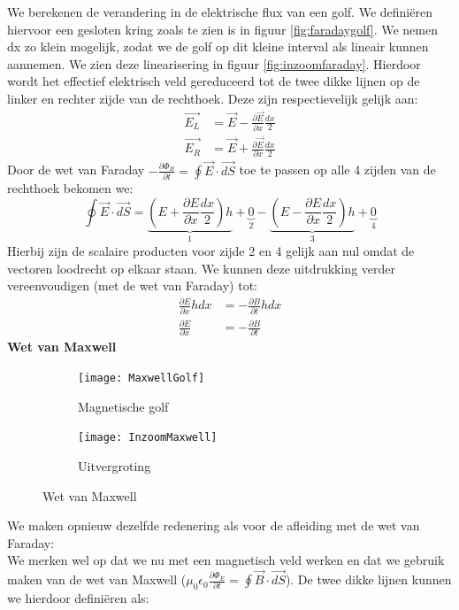 \documentclass[a4paper,kul]{kulakarticle} %
\begin{document}
We berekenen de verandering in de elektrische flux van een golf. We definiëren hiervoor een gesloten kring zoals te zien is in figuur \ref{fig:faradaygolf}. We nemen dx zo klein mogelijk, zodat we de golf op dit kleine interval als lineair kunnen aannemen. We zien deze linearisering in figuur \ref{fig:inzoomfaraday}. Hierdoor wordt het effectief elektrisch veld gereduceerd tot de twee dikke lijnen op de linker en rechter zijde van de rechthoek. Deze zijn respectievelijk gelijk aan:
\begin{align*}
	\vec{E_L} &= \vec{E}-\frac{\partial\vec{E}}{\partial x}\frac{dx}{2}\\
	\vec{E_R} &= \vec{E}+\frac{\partial\vec{E}}{\partial x}\frac{dx}{2}	
\end{align*}
Door de wet van Faraday $-\frac{\partial\Phi_B}{\partial t}= \oint\vec{E}\cdot\vec{dS}$ toe te passen op alle 4 zijden van de rechthoek bekomen we:
\begin{equation*}
	\oint\vec{E}\cdot\vec{dS} = \underbrace{(E+\frac{\partial E}{\partial x}\frac{dx}{2})h}_1 + \underbrace{0}_2 -\underbrace{(E-\frac{\partial E}{\partial x}\frac{dx}{2})h}_3 + \underbrace{0}_4
\end{equation*}
Hierbij zijn de scalaire producten voor zijde 2 en 4 gelijk aan nul omdat de vectoren loodrecht op elkaar staan. We kunnen deze uitdrukking verder vereenvoudigen (met de wet van Faraday) tot:
\begin{align}
	 \frac{\partial E}{\partial x}hdx &= -\frac{\partial B}{\partial t}hdx\\
	 \label{eq:inductieFaraday}
	 \frac{\partial E}{\partial x} &= -\frac{\partial B}{\partial t}
\end{align}
\newpage
\textbf{Wet van Maxwell}\\
\begin{figure}[h]
	\centering
	\begin{subfigure}{.5\textwidth}
		\centering
		\texttt{[image: MaxwellGolf]}
		\caption[Golf Maxwell]{Magnetische golf}
		\label{fig:maxwellgolf}
	\end{subfigure}%
	\begin{subfigure}{.5\textwidth}
		\centering
		\texttt{[image: InzoomMaxwell]}
		\caption[Inzoom maxwell]{Uitvergroting}
		\label{fig:inzoommaxwell}
	\end{subfigure}
	\caption{Wet van Maxwell}
	\label{fig:InductieMaxwell}
\end{figure}
We maken opnieuw dezelfde redenering als voor de afleiding met de wet van Faraday: \\ We merken wel op dat we nu met een magnetisch veld werken en dat we gebruik maken van de wet van Maxwell ($\mu_0\epsilon_0\frac{\partial \Phi_E}{\partial t}=\oint\vec{B}\cdot\vec{dS}$). De twee dikke lijnen kunnen we hierdoor definiëren als:
\end{document}
